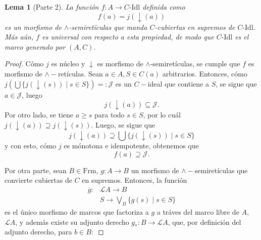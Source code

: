 \documentclass[12pt,letterpaper,titlepage]{article}
\newtheorem{lemma}{Lema}
\theoremstyle{definition}
\newcommand\down{{\downarrow}}
\renewcommand\inf{\wedge}
\newcommand\<{\langle}
\renewcommand\>{\rangle}
\newcommand\Idl{\text{-}\mathrm{Idl}}
\newcommand{\Frm}{\mathrm{Frm}}
\begin{document}

\begin{lemma}[Parte 2]
    La función $f:A\to C\Idl$ definida como
    \begin{equation*}
        f(a)=j(\down(a))
    \end{equation*}
    es un morfismo de $\inf$-semiretículas que
    manda $C$-cubiertas en supremos de $C\Idl$.
    Más aún, $f$ es universal con respecto a esta propiedad,
    de modo que $C\Idl$ es el marco generado por $(A,C)$.
\end{lemma}

\begin{proof}
    Cómo $j$ es núcleo y $\down$ es morfismo
    de $\inf$-semiretículas,
    se cumple que $f$ es morfismo de $\inf-$retículas.
    Sean $a\in A,S\in C(a)$ arbitrarios. Entonces, cómo $j(\bigcup\{j(\down(s))\mid s\in S\})=:\mathcal{J}$ es un $C-$ideal que contiene a $S$, se sigue que $a\in\mathcal{J}$, luego 
    \begin{equation*}
        j(\down(a))\subseteq \mathcal{J}.
    \end{equation*}
    Por otro lado, se tiene $a\geq s$ para todo $s\in S$, por lo cuál $j(\down(a))\supseteq j(\down(s))$. Luego, se sigue que
    \begin{equation*}
        j(\down(a))\supseteq \bigcup\{j(\down(s))\mid s\in S\}
    \end{equation*}
    y con esto, cómo $j$ es mónotona e idempotente, obtenemos que
    \begin{equation*}
        f(a)\supseteq\mathcal{J}.
    \end{equation*}

    Por otra parte, sean $B\in\Frm$, $g:A\to B$ un morfismo de $\wedge-$semiretículas que convierte cubiertas de $C$ en supremos. Entonces, la función 
    \begin{align*}
        \overline{g}: &\mathcal{L}A\to B \\
                      & S\to \bigvee_B\{g(s)\mid s\in S\}
    \end{align*}
    es el único morfismo de marcos que factoriza a $g$ a tráves del marco libre de $A$, $\mathcal{L}A$, y además existe su adjunto derecho $g_*:B\to\mathcal{L}A$, que, por definición del adjunto derecho, para $b\in B:$


\end{proof}
\end{document}
